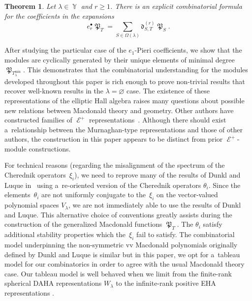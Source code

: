\documentclass[pdftex]{sigma}
\numberwithin{equation}{section}
\newtheorem{Theorem}{Theorem}[section]
\theoremstyle{definition}
\DeclareMathOperator{\Par}{\mathbb{Y}}
\DeclareMathOperator{\MacD}{\mathfrak{P}}
\DeclareMathOperator{\sE}{\mathcal{E}}
\begin{document}
\begin{Theorem}
 Let $\lambda \in \Par$ and $r\geq 1$. There is an explicit combinatorial formula for the coefficients  in the expansions
 \[
 e_r^{\bullet}\MacD_T = \sum_{S \in \Omega(\lambda)} \mathfrak{d}^{(r)}_{S,T} \MacD_{S}.
 \]

\end{Theorem}
After studying the particular case of the $e_1$-Pieri coefficients, we show that the modules  are cyclically generated by their unique elements of minimal degree $\MacD_{T_{\lambda}^{\min}}$. This demonstrates that the combinatorial understanding for the modules  developed throughout this paper is rich enough to prove non-trivial results that recover well-known results in the $\lambda = \varnothing$ case. The existence of these representations of the elliptic Hall algebra raises many questions about possible new relations between Macdonald theory and geometry. Other authors have constructed families of $\sE^{+}$ representations~\cite{FFJMM_2011,FJMM_2012}. Although there should exist a~relationship between the Murnaghan-type representations  and those of other authors, the construction in this paper appears to be distinct from prior $\sE^{+}$-module constructions.

For technical reasons (regarding the misalignment of the spectrum of the Cherednik operators~$\xi_i$), we need to reprove many of the results of Dunkl and Luque in~\cite{DL_2011} using a~re-oriented version of the Cherednik operators $\theta_i$. Since the elements~$\theta_i$ are not uniformly conjugate to the~$\xi_i$ on the vector-valued polynomial spaces $V_{\lambda}$, we are not immediately able to use the results of Dunkl and Luque. This alternative choice of conventions greatly assists during the construction of the generalized Macdonald functions $\MacD_{T}$. The $\theta_i$ satisfy additional stability properties which the~$\xi_i$ fail to satisfy. The combinatorial model underpinning the non-symmetric vv Macdonald polynomials originally defined by Dunkl and Luque is similar but in this paper, we opt for a~tableau model for our combinatorics in order to agree with the usual Macdonald theory case. Our tableau model is well behaved when we limit from the finite-rank spherical DAHA representations $W_{\lambda}$ to the infinite-rank positive EHA representations .
\end{document}

